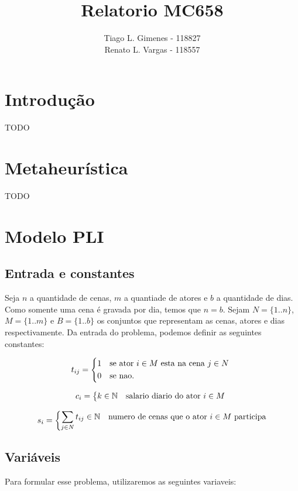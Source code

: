 \documentclass[a4paper,11pt,twoside]{article}
\title{Relatorio MC658}
\author{Tiago L. Gimenes - 118827\\
        Renato L. Vargas - 118557}
\begin{document}
\maketitle

\section{Introdução}
TODO

\section{Metaheurística}
TODO

\section{Modelo PLI}
\subsection{Entrada e constantes}
Seja $n$ a quantidade de cenas, $m$ a quantiade de atores e $b$ a quantidade de
dias. Como somente uma cena é gravada por dia, temos que $n = b$. Sejam $N=\{1..n\}$,
$M = \{1..m\}$ e $B=\{1..b\}$ os conjuntos que representam as cenas, atores e dias
respectivamente. Da entrada do problema, podemos definir as seguintes constantes:

\begin{equation}
  t_{ij} = \begin{dcases*}
              1 & se ator $i \in M$ esta na cena $j \in N$ \\
              0 & se nao.
           \end{dcases*}
  \label{tij}
\end{equation}

\begin{equation}
  c_{i} = \begin{dcases*} k \in \mathbb{N} & salario diario do ator $i \in M$ \end{dcases*}
\end{equation}

\begin{equation}
  s_{i} = \begin{dcases*} \sum_{j \in N} t_{ij} \in \mathbb{N} & numero de cenas que o ator $i \in M$ participa\end{dcases*}
\end{equation}

\subsection{Variáveis}
Para formular esse problema, utilizaremos as seguintes variaveis:
\end{document}
